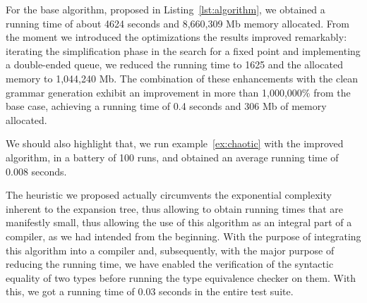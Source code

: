 For the base algorithm, proposed in Listing~\ref{lst:algorithm}, we
obtained a running time of about 4624 seconds and
8,660,309 Mb memory allocated. From the moment we introduced the
optimizations the results improved remarkably: iterating the
simplification phase in the search for a fixed point and implementing
a double-ended queue, we reduced the running time to 1625 and the 
allocated memory to 1,044,240 Mb. The 
combination of these enhancements with the clean grammar generation
exhibit an improvement in more than 1,000,000\% from the base case,
achieving a running time of 0.4 seconds and 306 Mb 
of memory allocated.


We should also highlight that, we run example~\eqref{ex:chaotic}
with the improved algorithm, in a battery of 100 runs, and obtained an
average running time of 0.008 seconds.

The heuristic we proposed actually circumvents the exponential complexity 
inherent to the expansion tree, thus allowing to obtain running times that 
are manifestly small, thus allowing the use of this algorithm as an integral 
part of a compiler, as we had intended from the beginning. 
%
With the purpose of integrating this algorithm into a compiler and, subsequently,
with the major purpose of reducing the running time,
we have enabled the verification of the syntactic equality of two types 
before running the type equivalence checker on them. 
With this, we got a running time of 0.03 seconds 
in the entire test suite.

